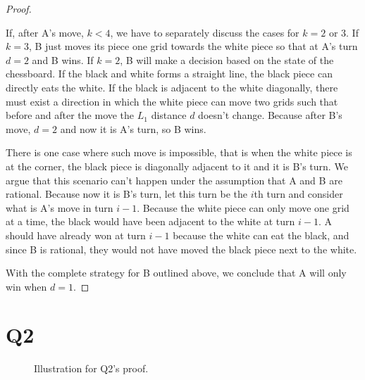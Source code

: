 \documentclass[a4paper]{article}
\theoremstyle{definition}
\begin{document}
\begin{proof}
\begin{itemize}
        If, after A's move, $k < 4$, we have to separately discuss the cases for
        $k = 2$ or 3. If $k = 3$, B just moves its piece one grid towards the
        white piece so that at A's turn $d = 2$ and B wins. If $k = 2$, B will
        make a decision based on the state of the chessboard. If the black and
        white forms a straight line, the black piece can directly eats the
        white. If the black is adjacent to the white diagonally, there must
        exist a direction in which the white piece can move two grids such that
        before and after the move the $L_1$ distance $d$ doesn't change. Because
        after B's move, $d = 2$ and now it is A's turn, so B wins.

        There is one case where such move is impossible, that is when the white
        piece is at the corner, the black piece is diagonally adjacent to it and
        it is B's turn. We argue that this scenario can't happen under the
        assumption that A and B are rational. Because now it is B's turn, let
        this turn be the $i$th turn and consider what is A's move in turn $i -
        1$. Because the white piece can only move one grid at a time, the black
        would have been adjacent to the white at turn $i - 1$. A should have
        already won at turn $i - 1$ because the white can eat the black, and
        since B is rational, they would not have moved the black piece next to
        the white.
    \end{itemize}
    With the complete strategy for B outlined above, we conclude that A will
    only win when $d = 1$.
\end{proof}

\section*{Q2}

\begin{figure}[ht]
    \centering
    \caption{Illustration for Q2's proof.}
    \label{fig:q2-proof-illustration}
\end{figure}
\end{document}
